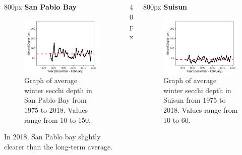 \documentclass[
]{book}
\begin{document}
\begin{columns}[T]
\begin{column}{800px\textwidth}
\textbf{San Pablo Bay}

\begin{figure}
\includegraphics[width=15.25in]{figures/secchi_splwinter} \caption{Graph of average winter secchi depth in San Pablo Bay from 1975 to 2018. Values range from 10 to 150.}\label{fig:unnamed-chunk-146}
\end{figure}

In 2018, San Pablo bay slightly clearer than the long-term average.
\end{column}

\begin{column}{40px\textwidth}
~
\end{column}

\begin{column}{800px\textwidth}
\textbf{Suisun}

\begin{figure}
\includegraphics[width=15.25in]{figures/secchi_sswinter} \caption{Graph of average winter secchi depth in Suisun from 1975 to 2018. Values range from 10 to 60.}\label{fig:unnamed-chunk-147}
\end{figure}


\end{column}
\end{columns}
\end{document}

